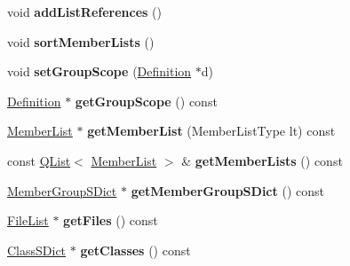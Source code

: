 \begin{DoxyCompactItemize}
\item 
\hypertarget{class_group_def_a6b28c57cb8b05f6fe38f771e62b9aa17}{void {\bfseries add\-List\-References} ()}\label{class_group_def_a6b28c57cb8b05f6fe38f771e62b9aa17}

\item 
\hypertarget{class_group_def_a8769ab4803a557422b86e565cb6b30d0}{void {\bfseries sort\-Member\-Lists} ()}\label{class_group_def_a8769ab4803a557422b86e565cb6b30d0}

\item 
\hypertarget{class_group_def_a8b29ecc6076179b0de17be1fc85bbb04}{void {\bfseries set\-Group\-Scope} (\hyperlink{class_definition}{Definition} $\ast$d)}\label{class_group_def_a8b29ecc6076179b0de17be1fc85bbb04}

\item 
\hypertarget{class_group_def_aad7ad84d7eb717b2fbd2c49d5b813f10}{\hyperlink{class_definition}{Definition} $\ast$ {\bfseries get\-Group\-Scope} () const }\label{class_group_def_aad7ad84d7eb717b2fbd2c49d5b813f10}

\item 
\hypertarget{class_group_def_ad83336a442ba60d58c394f209406d8c2}{\hyperlink{class_member_list}{Member\-List} $\ast$ {\bfseries get\-Member\-List} (Member\-List\-Type lt) const }\label{class_group_def_ad83336a442ba60d58c394f209406d8c2}

\item 
\hypertarget{class_group_def_a07df9da2a270da9811acecc6f1b3f302}{const \hyperlink{class_q_list}{Q\-List}$<$ \hyperlink{class_member_list}{Member\-List} $>$ \& {\bfseries get\-Member\-Lists} () const }\label{class_group_def_a07df9da2a270da9811acecc6f1b3f302}

\item 
\hypertarget{class_group_def_a614eab46ad0165205bfc3367124bce0a}{\hyperlink{class_member_group_s_dict}{Member\-Group\-S\-Dict} $\ast$ {\bfseries get\-Member\-Group\-S\-Dict} () const }\label{class_group_def_a614eab46ad0165205bfc3367124bce0a}

\item 
\hypertarget{class_group_def_ae8440604622065ec26bb615bbaf1a16e}{\hyperlink{class_file_list}{File\-List} $\ast$ {\bfseries get\-Files} () const }\label{class_group_def_ae8440604622065ec26bb615bbaf1a16e}

\item 
\hypertarget{class_group_def_a5d26911bf215743666b18290bdccc16d}{\hyperlink{class_class_s_dict}{Class\-S\-Dict} $\ast$ {\bfseries get\-Classes} () const }\label{class_group_def_a5d26911bf215743666b18290bdccc16d}


\end{DoxyCompactItemize}
